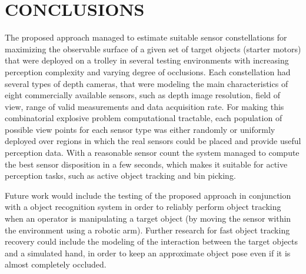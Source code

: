 \section{\uppercase{Conclusions}}\label{sec:conclusions}

\noindent The proposed approach managed to estimate suitable sensor constellations for maximizing the observable surface of a given set of target objects (starter motors) that were deployed on a trolley in several testing environments with increasing perception complexity and varying degree of occlusions. Each constellation had several types of depth cameras, that were modeling the main characteristics of eight commercially available sensors, such as depth image resolution, field of view, range of valid measurements and data acquisition rate. For making this combinatorial explosive problem computational tractable, each population of possible view points for each sensor type was either randomly or uniformly deployed over regions in which the real sensors could be placed and provide useful perception data. With a reasonable sensor count the system managed to compute the best sensor disposition in a few seconds, which makes it suitable for active perception tasks, such as active object tracking and bin picking.

Future work would include the testing of the proposed approach in conjunction with a object recognition system in order to reliably perform object tracking when an operator is manipulating a target object (by moving the sensor within the environment using a robotic arm). Further research for fast object tracking recovery could include the modeling of the interaction between the target objects and a simulated hand, in order to keep an approximate object pose even if it is almost completely occluded.
